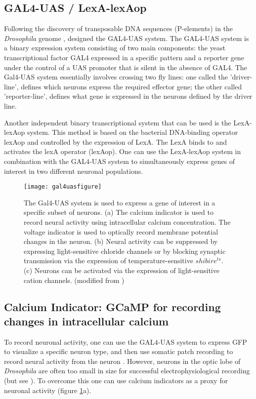 \subsection{GAL4-UAS / LexA-lexAop}
Following the discovery of transposable DNA sequences (P-elements) in the \textit{Drosophila} genome \parencite{Rubin1982}, \cite{Brand1993} designed the GAL4-UAS system. The GAL4-UAS system is a binary expression system consisting of two main components: the yeast transcriptional factor GAL4 expressed in a specific pattern and a reporter gene under the control of a UAS promoter that is silent in the absence of GAL4. The Gal4-UAS system essentially involves crossing two fly lines: one called the 'driver-line', defines which neurons express the required effector gene; the other called 'reporter-line', defines what gene is expressed in the neurons defined by the driver line. 

Another independent binary transcriptional system that can be used is the LexA-lexAop system. This method is based on the bacterial DNA-binding operator lexAop and controlled by the expression of LexA. The LexA binds to and activates the lexA operator (lexAop). One can use the LexA-lexAop system in combination with the GAL4-UAS system to simultaneously express genes of interest in two different neuronal populations. %
\begin{figure}
\centering
\hspace*{-1cm} 
\texttt{[image: gal4uasfigure]}
\caption[Genetic tools for functional manipulations in \textit{Drosophila}] {The Gal4-UAS system is used to express a gene of interest in a specific subset of neurons. (a) The calcium indicator is used to record neural activity using intracellular calcium concentration. The voltage indicator is used to optically record membrane potential changes in the neuron. (b) Neural activity can be suppressed by expressing light-sensitive chloride channels or by blocking synaptic transmission via the expression of temperature-sensitive $shibire^{ts}$. (c) Neurons can be activated via the expression of light-sensitive cation channels. (modified from \cite{Borst2009})}
\label{fig:gal4uas}
\end{figure}
\subsection{Calcium Indicator: GCaMP for recording changes in intracellular calcium}
To record neuronal activity, one can use the GAL4-UAS system to express GFP to visualize a specific neuron type, and then use somatic patch recording to record neural activity from the neuron \parencite{Wilson2004, Joesch2008}. However, neurons in the optic lobe of \textit{Drosophila} are often too small in size for successful electrophysiological recording (but see \cite{Groschner2022, Gruntman2018}). To overcome this one can use calcium indicators as a proxy for neuronal activity (figure  \ref{fig:gal4uas}a). 

